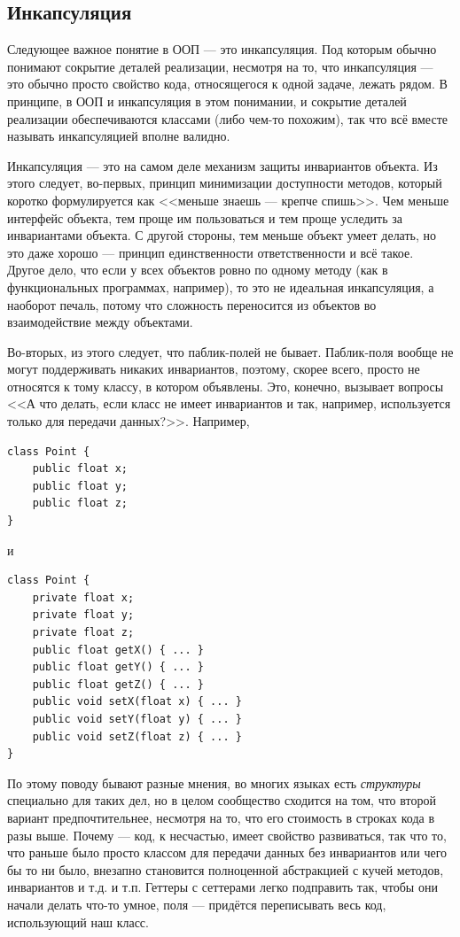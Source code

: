 \documentclass{../text-style}
\begin{document}
\subsection{Инкапсуляция}

Следующее важное понятие в ООП --- это инкапсуляция. Под которым обычно понимают сокрытие деталей реализации, несмотря на то, что инкапсуляция --- это обычно просто свойство кода, относящегося к одной задаче, лежать рядом. В принципе, в ООП и инкапсуляция в этом понимании, и сокрытие деталей реализации обеспечиваются классами (либо чем-то похожим), так что всё вместе называть инкапсуляцией вполне валидно.

Инкапсуляция --- это на самом деле механизм защиты инвариантов объекта. Из этого следует, во-первых, принцип минимизации доступности методов, который коротко формулируется как <<меньше знаешь --- крепче спишь>>. Чем меньше интерфейс объекта, тем проще им пользоваться и тем проще уследить за инвариантами объекта. С другой стороны, тем меньше объект умеет делать, но это даже хорошо --- принцип единственности ответственности и всё такое. Другое дело, что если у всех объектов ровно по одному методу (как в функциональных программах, например), то это не идеальная инкапсуляция, а наоборот печаль, потому что сложность переносится из объектов во взаимодействие между объектами.

Во-вторых, из этого следует, что паблик-полей не бывает. Паблик-поля вообще не могут поддерживать никаких инвариантов, поэтому, скорее всего, просто не относятся к тому классу, в котором объявлены. Это, конечно, вызывает вопросы <<А что делать, если класс не имеет инвариантов и так, например, используется только для передачи данных?>>. Например,

\begin{verbatim}
class Point {
    public float x;
    public float y;
    public float z;
}
\end{verbatim}

и

\begin{verbatim}
class Point {
    private float x;
    private float y;
    private float z;
    public float getX() { ... }
    public float getY() { ... }
    public float getZ() { ... }
    public void setX(float x) { ... }
    public void setY(float y) { ... }
    public void setZ(float z) { ... }
}
\end{verbatim}

По этому поводу бывают разные мнения, во многих языках есть \emph{структуры} специально для таких дел, но в целом сообщество сходится на том, что второй вариант предпочтительнее, несмотря на то, что его стоимость в строках кода в разы выше. Почему --- код, к несчастью, имеет свойство развиваться, так что то, что раньше было просто классом для передачи данных без инвариантов или чего бы то ни было, внезапно становится полноценной абстракцией с кучей методов, инвариантов и т.д. и т.п. Геттеры с сеттерами легко подправить так, чтобы они начали делать что-то умное, поля --- придётся переписывать весь код, использующий наш класс.
\end{document}
